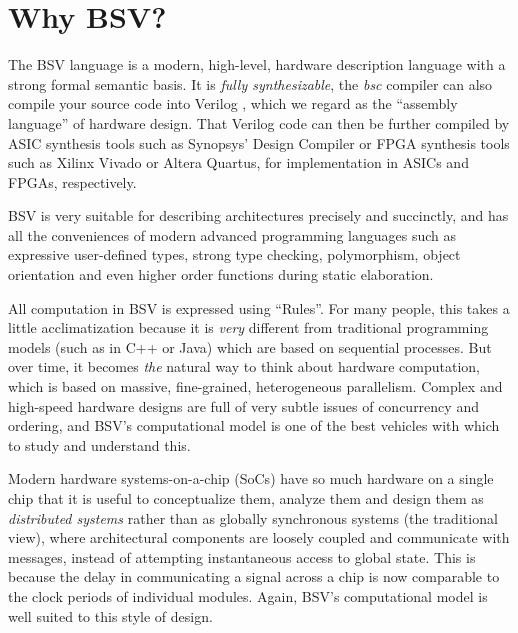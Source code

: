 

\chapter{Why BSV?}


\setcounter{page}{1}
\renewcommand{\thepage}{\Alph{chapter}-\arabic{page}}

\label{apx_BSV}


The BSV language is a modern, high-level, hardware description
language with a strong formal semantic basis.  It is \emph{fully
synthesizable}, {\ie} the \emph{bsc} compiler can also compile your
source code into Verilog \cite{IEEEVerilog2005a}, which we regard as
the ``assembly language'' of hardware design.  That Verilog code can
then be further compiled by ASIC synthesis tools such as Synopsys'
Design Compiler or FPGA synthesis tools such as Xilinx Vivado or
Altera Quartus, for implementation in ASICs and FPGAs, respectively.

BSV is very suitable for describing architectures precisely and
succinctly, and has all the conveniences of modern advanced
programming languages such as expressive user-defined types, strong
type checking, polymorphism, object orientation and even higher order
functions during static elaboration.

All computation in BSV is expressed using ``Rules''.  For many people,
this takes a little acclimatization because it is \emph{very}
different from traditional programming models (such as in C++ or Java)
which are based on sequential processes.  But over time, it becomes
\emph{the} natural way to think about hardware computation, which is
based on massive, fine-grained, heterogeneous parallelism.  Complex
and high-speed hardware designs are full of very subtle issues of
concurrency and ordering, and BSV's computational model is one of the
best vehicles with which to study and understand this.

Modern hardware systems-on-a-chip (SoCs) have so much hardware on a
single chip that it is useful to conceptualize them, analyze them and
design them as \emph{distributed systems} rather than as globally
synchronous systems (the traditional view), {\ie} where architectural
components are loosely coupled and communicate with messages, instead
of attempting instantaneous access to global state.  This is because
the delay in communicating a signal across a chip is now comparable to
the clock periods of individual modules.  Again, BSV's computational
model is well suited to this style of design.

